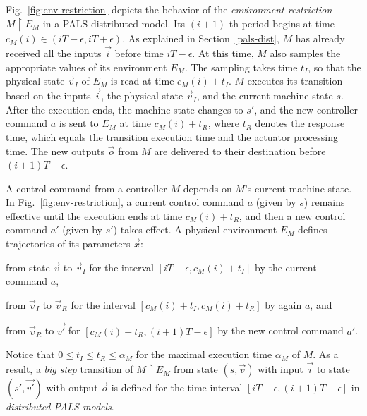 Fig.~\ref{fig:env-restriction} depicts the behavior of 
the \emph{environment restriction} $M \restriction E_M$ %
in a PALS distributed model. %
Its $(i+1)$-th period begins  at time $c_M(i) \in (i T - \epsilon, i T + \epsilon)$. 
As explained in Section~\ref{pals-dist}, $M$ has already received all the inputs $\vec{i}$ %
before time $i T - \epsilon$.  At this time, $M$ also samples the
appropriate values of its environment $E_M$. The sampling takes time
$t_I$, so that 
the physical state $\vec{v}_I$ of $E_M$ is read at time $c_M(i) + t_I$.
$M$ executes its transition based on the inputs $\vec{i}$, the %
physical state $\vec{v}_I$,  and the current 
machine state $s$.
%
After the execution ends,
the machine state changes to  $s'$, and the new controller command $a$
is sent to $E_M$  at time  $c_M(i) + t_R$, %
where $t_R$ denotes the response time, 
which equals the transition execution time and the actuator processing time.
The new outputs $\vec{o}$ from $M$ are delivered to their destination before $(i+1) T - \epsilon$.




A control command from a controller $M$ depends on $M$'s current 
machine state.
In Fig.~\ref{fig:env-restriction}, a current control command $a$ (given by $s$) remains effective 
until the execution ends at time $c_M(i) + t_R$,
and then a new control command $a'$ (given by $s'$) takes effect.
A physical environment 
$E_M$ defines trajectories of its parameters $\vec{x}$:
\begin{inparaenum}[(i)]
    \item from state $\vec{v}$ to $\vec{v}_I$ for the interval $[iT - \epsilon, c_M(i) + t_I]$ by the current command $a$,
    \item from $\vec{v}_I$ to $\vec{v}_R$ for the interval $[c_M(i) + t_I, c_M(i) + t_R]$ by again $a$, and 
    \item from $\vec{v}_R$ to $\vec{v'}$ for $[c_M(i) + t_R, (i+1)T-\epsilon]$ by the new control command $a'$.
\end{inparaenum}
Notice that $0 \leq t_I \leq t_R \leq \alpha_M$ for the maximal execution time $\alpha_M$  of $M$.
As a result,
a \emph{big step} transition of $M \restriction E_M$ from state $(s, \vec{v})$ with input $\vec{i}$ 
to state $(s',\vec{v'})$ with output $\vec{o}$
is defined for the time interval $[iT - \epsilon, (i+1)T-\epsilon]$ in \emph{distributed PALS models}.

